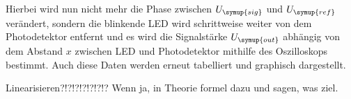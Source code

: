 Hierbei wird nun nicht mehr die Phase zwischen $U_{\symup{sig}}$ und $U_{\symup{ref}}$ verändert, sondern die blinkende LED 
wird schrittweise weiter von dem Photodetektor entfernt und es wird die Signalstärke $U_{\symup{out}}$ abhängig von dem 
Abstand $x$ zwischen LED und Photodetektor mithilfe des Oszilloskops bestimmt. Auch diese Daten werden erneut tabelliert und
graphisch dargestellt. 

Linearisieren?!?!?!?!?!?!? Wenn ja, in Theorie formel dazu und sagen, was ziel.